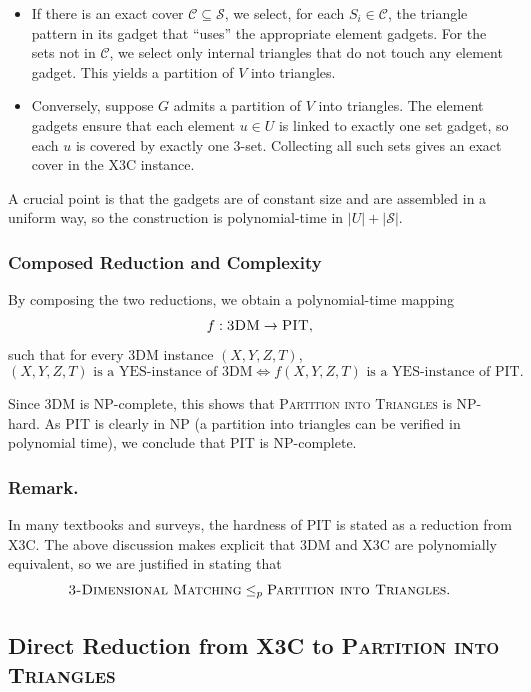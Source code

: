 \documentclass[9pt]{extarticle}
\begin{document}
\begin{itemize}
    \item If there is an exact cover $\mathcal{C} \subseteq \mathcal{S}$, we
          select, for each $S_i \in \mathcal{C}$, the triangle pattern in its
          gadget that ``uses'' the appropriate element gadgets.  For the sets
          not in $\mathcal{C}$, we select only internal triangles that do not
          touch any element gadget.  This yields a partition of $V$ into
          triangles.

    \item Conversely, suppose $G$ admits a partition of $V$ into triangles.
          The element gadgets ensure that each element $u \in U$ is linked to
          exactly one set gadget, so each $u$ is covered by exactly one 3-set.
          Collecting all such sets gives an exact cover in the X3C instance.
\end{itemize}

A crucial point is that the gadgets are of constant size and are assembled in a
uniform way, so the construction is polynomial-time in $|U| + |\mathcal{S}|$.

\subsubsection*{Composed Reduction and Complexity}

By composing the two reductions, we obtain a polynomial-time mapping
\[
    f : \textsc{3DM} \to \textsc{PIT},
\]
such that for every 3DM instance $(X,Y,Z,T)$,
\[
    (X,Y,Z,T) \text{ is a YES-instance of 3DM}
    \iff
    f(X,Y,Z,T) \text{ is a YES-instance of PIT}.
\]

Since 3DM is NP-complete, this shows that \textsc{Partition into Triangles} is
NP-hard.  As PIT is clearly in NP (a partition into triangles can be verified
in polynomial time), we conclude that PIT is NP-complete.

\subsubsection*{Remark.}
In many textbooks and surveys, the hardness of PIT is stated as a reduction
from X3C.  The above discussion makes explicit that 3DM and X3C are
polynomially equivalent, so we are justified in stating that
\[
    \textsc{3-Dimensional Matching} \le_p \textsc{Partition into Triangles}.
\]
\subsection{Direct Reduction from \textsc{X3C} to \textsc{Partition into Triangles}}
\end{document}
